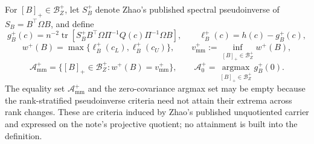 For \([B]_+\in\mathcal B_Z^+\), let \(S_B^+\) denote Zhao's published spectral pseudoinverse of \(S_B=B^{\top}\Omega B\), and define
\[
g_B^+(c)=n^{-2}\operatorname{tr}\!\left[S_B^+B^{\top}\Omega\Pi^{-1}Q(c)\Pi^{-1}\Omega B\right],
\qquad \ell_B^+(c)=h(c)-g_B^+(c),
\]
\[
w^+(B)=\max\{\ell_B^+(c_L),\ell_B^+(c_U)\},
\qquad v_{\mathrm{mm}}^+:=\inf_{[B]_+\in\mathcal B_Z^+}w^+(B),
\]
\[
\mathcal A_{\mathrm{mm}}^+
=\{[B]_+\in\mathcal B_Z^+:w^+(B)=v_{\mathrm{mm}}^+\},
\qquad \mathcal A_0^+=\operatorname*{argmax}_{[B]_+\in\mathcal B_Z^+}g_B^+(0).
\]
The equality set \(\mathcal A_{\mathrm{mm}}^+\) and the zero-covariance argmax set may be empty because the rank-stratified pseudoinverse criteria need not attain their extrema across rank changes.  These are criteria induced by Zhao's published unquotiented carrier and expressed on the note's projective quotient; no attainment is built into the definition.